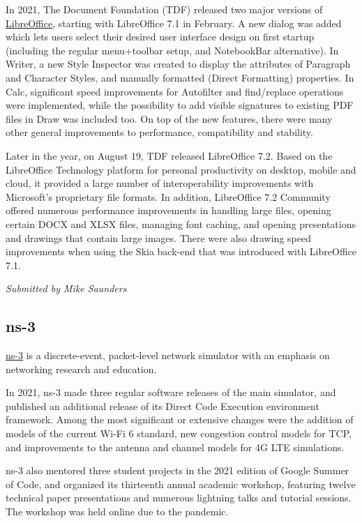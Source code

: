 \documentclass[a4paper]{report}
\begin{document}
In 2021, The Document Foundation (TDF) released two major versions of \href{https://www.libreoffice.org/}{LibreOffice}, starting with LibreOffice 7.1 in February. A new dialog was added which lets users select their desired user interface design on first startup (including the regular menu+toolbar setup, and NotebookBar alternative). In Writer, a new Style Inspector was created to display the attributes of Paragraph and Character Styles, and manually formatted (Direct Formatting) properties. In Calc, significant speed improvements for Autofilter and find/replace operations were implemented, while the possibility to add visible signatures to existing PDF files in Draw was included too. On top of the new features, there were many other general improvements to performance, compatibility and stability.

Later in the year, on August 19, TDF released LibreOffice 7.2. Based on the LibreOffice Technology platform for personal productivity on desktop, mobile and cloud, it provided a large number of interoperability improvements with Microsoft's proprietary file formats. In addition, LibreOffice 7.2 Community offered numerous performance improvements in handling large files, opening certain DOCX and XLSX files, managing font caching, and opening presentations and drawings that contain large images. There were also drawing speed improvements when using the Skia back-end that was introduced with LibreOffice 7.1.

{\em Submitted by Mike Saunders}

\subsection{ns-3}

\href{https://www.nsnam.org}{ns-3} is a discrete-event, packet-level network simulator with an emphasis on networking research and education.

In 2021, ns-3 made three regular software releases of the main simulator, and published an additional release of its Direct Code Execution environment framework.  Among the most significant or extensive changes were the addition of models of the current Wi-Fi 6 standard, new congestion control models for TCP, and improvements to the antenna and channel models for 4G LTE simulations.

ns-3 also mentored three student projects in the 2021 edition of Google Summer of Code, and organized its thirteenth annual academic workshop, featuring twelve technical paper presentations and numerous lightning talks and tutorial sessions.  The workshop was held online due to the pandemic.
\end{document}

